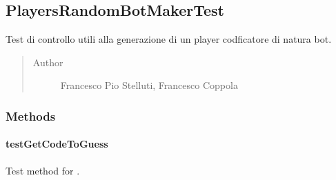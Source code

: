 \documentclass[letterpaper,10pt,italian,openany,oneside]{sphinxmanual}
\begin{document}
\subsection{PlayersRandomBotMakerTest}
\label{\detokenize{test/it/unicam/cs/pa/mastermind/test/PlayersRandomBotMakerTest:playersrandombotmakertest}}\label{\detokenize{test/it/unicam/cs/pa/mastermind/test/PlayersRandomBotMakerTest::doc}}

\begin{fulllineitems}
\label{\detokenize{test/it/unicam/cs/pa/mastermind/test/PlayersRandomBotMakerTest:it.unicam.cs.pa.mastermind.test.PlayersRandomBotMakerTest}}
Test di controllo utili alla generazione di un player codficatore di natura bot.
\begin{quote}\begin{description}
\item[{Author}] \leavevmode
Francesco Pio Stelluti, Francesco Coppola

\end{description}\end{quote}

\end{fulllineitems}



\subsubsection{Methods}
\label{\detokenize{test/it/unicam/cs/pa/mastermind/test/PlayersRandomBotMakerTest:methods}}

\paragraph{testGetCodeToGuess}
\label{\detokenize{test/it/unicam/cs/pa/mastermind/test/PlayersRandomBotMakerTest:testgetcodetoguess}}

\begin{fulllineitems}
\label{\detokenize{test/it/unicam/cs/pa/mastermind/test/PlayersRandomBotMakerTest:it.unicam.cs.pa.mastermind.test.PlayersRandomBotMakerTest.testGetCodeToGuess()}}
Test method for .

\end{fulllineitems}
\end{document}
